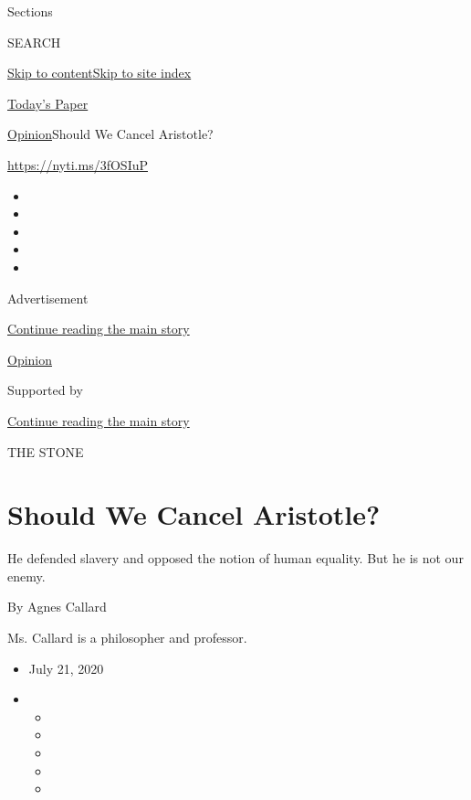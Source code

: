 Sections

SEARCH

\protect\hyperlink{site-content}{Skip to
content}\protect\hyperlink{site-index}{Skip to site index}

\href{https://myaccount.nytimes.com/auth/login?response_type=cookie\&client_id=vi}{}

\href{https://www.nytimes.com/section/todayspaper}{Today's Paper}

\href{/section/opinion}{Opinion}\textbar{}Should We Cancel Aristotle?

\href{https://nyti.ms/3fOSIuP}{https://nyti.ms/3fOSIuP}

\begin{itemize}
\item
\item
\item
\item
\item
\end{itemize}

Advertisement

\protect\hyperlink{after-top}{Continue reading the main story}

\href{/section/opinion}{Opinion}

Supported by

\protect\hyperlink{after-sponsor}{Continue reading the main story}

THE STONE

\hypertarget{should-we-cancel-aristotle}{%
\section{Should We Cancel Aristotle?}\label{should-we-cancel-aristotle}}

He defended slavery and opposed the notion of human equality. But he is
not our enemy.

By Agnes Callard

Ms. Callard is a philosopher and professor.

\begin{itemize}
\item
  July 21, 2020
\item
  \begin{itemize}
  \item
  \item
  \item
  \item
  \item
  \end{itemize}
\end{itemize}

